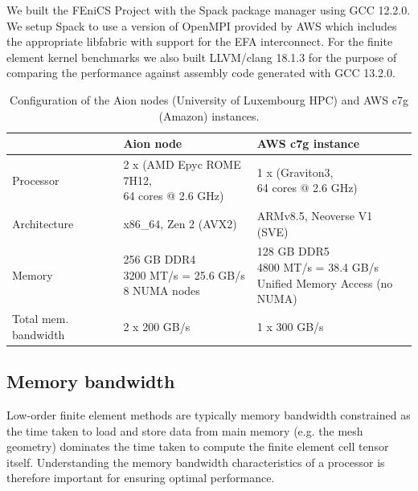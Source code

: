 We built the FEniCS Project with the Spack package manager using GCC 12.2.0. We
setup Spack to use a version of OpenMPI provided by AWS which includes the
appropriate libfabric with support for the EFA interconnect. For the finite
element kernel benchmarks we also built LLVM/clang 18.1.3 for the purpose of
comparing the performance against assembly code generated with GCC 13.2.0.

\begin{table}
  \footnotesize
  \renewcommand{\arraystretch}{1.5}
  \begin{tabular}{l|l|l}
                              & Aion node                                                          & AWS c7g instance \\ \hline \hline
    Processor                 & \makecell[l]{2 x (AMD Epyc ROME 7H12, \\ 64 cores @ 2.6 GHz)}      & \makecell[l]{1 x (Graviton3, \\ 64 cores @ 2.6 GHz)} \\ \hline
    Architecture              & x86\_64, Zen 2 (AVX2)                                              & ARMv8.5, Neoverse V1 (SVE) \\ \hline
    Memory                    & \makecell[l]{256 GB DDR4 \\ 3200 MT/s = 25.6 GB/s \\ 8 NUMA nodes} & \makecell[l]{128 GB DDR5 \\ 4800 MT/s = 38.4 GB/s \\ Unified Memory Access (no NUMA) } \\ \hline
    Total mem. bandwidth      & 2 x 200 GB/s                                                       & 1 x 300 GB/s \\ \hline
  \end{tabular}
  \vspace{5pt}
  \caption{Configuration of the Aion nodes (University of Luxembourg HPC) and AWS c7g (Amazon) instances.}
  \label{tab:aion-aws-config}
\end{table}


\subsection*{Memory bandwidth}

Low-order finite element methods are typically memory bandwidth constrained as
the time taken to load and store data from main memory (e.g. the mesh geometry)
dominates the time taken to compute the finite element cell tensor itself.
Understanding the memory bandwidth characteristics of a processor is therefore
important for ensuring optimal performance.

